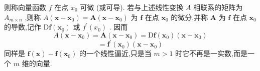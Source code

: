 则称向量函数 \(f\) 在点 \({x}_{0}\) 可微 (或可导). 若与上述线性变换 \(A\) 相联系的矩阵为 \({A}_{m \times  n}\) ,则称 \(A\left( {\mathbf{x} - {\mathbf{x}}_{0}}\right)  = \mathbf{A}\left( {\mathbf{x} - {\mathbf{x}}_{0}}\right)\) 为 \(\mathbf{f}\) 在点 \({\mathbf{x}}_{0}\) 的微分,并称 \(\mathbf{A}\) 为 \(\mathbf{f}\) 在点 \({\mathbf{x}}_{0}\) 的导数,记作 \(\mathrm{D}\mathbf{f}\left( {\mathbf{x}}_{0}\right)\) 或 \({f}^{\prime }\left( {x}_{0}\right)\) . 因而
\[
A\left( {\mathbf{x} - {\mathbf{x}}_{0}}\right)  = \mathbf{A}\left( {\mathbf{x} - {\mathbf{x}}_{0}}\right)  = \mathrm{D}\mathbf{f}\left( {\mathbf{x}}_{0}\right) \left( {\mathbf{x} - {\mathbf{x}}_{0}}\right)
\]
\[
= {\mathbf{f}}^{\prime }\left( {\mathbf{x}}_{0}\right) \left( {\mathbf{x} - {\mathbf{x}}_{0}}\right)  \tag{4}
\]
同样是 \(\mathbf{f}\left( \mathbf{x}\right)  - \mathbf{f}\left( {\mathbf{x}}_{0}\right)\) 的一个线性逼近,只是当 \(m > 1\) 时它不再是一实数,而是一个 \(m\) 维的向量.

